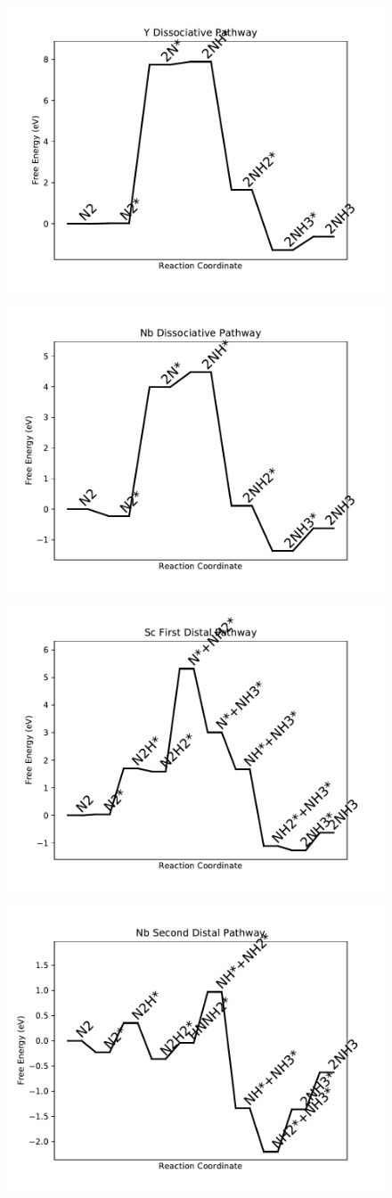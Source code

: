 \documentclass[journal=jacsat,manuscript=article]{achemso}
\begin{document}
\begin{figure}
\includegraphics[width=0.5\linewidth]{data/plots/Y_dissociative.pdf}
\label{fig:Y_dissociative}
\end{figure}

\newpage
\begin{figure}
\includegraphics[width=0.5\linewidth]{data/plots/Nb_dissociative.pdf}
\label{fig:Nb_dissociative}
\end{figure}

\begin{figure}
\includegraphics[width=0.5\linewidth]{data/plots/Sc_distal_1.pdf}
\label{fig:Sc_distal_1}
\end{figure}

\newpage
\begin{figure}
\includegraphics[width=0.5\linewidth]{data/plots/Nb_distal_2.pdf}
\label{fig:Nb_distal_2}
\end{figure}
\end{document}
